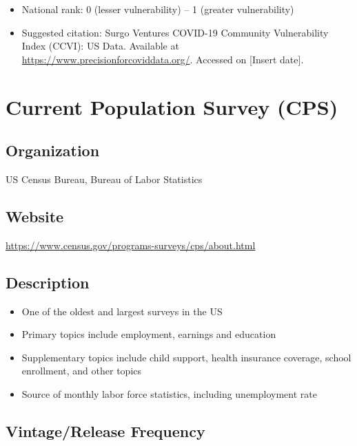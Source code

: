 \documentclass[
]{book}
\providecommand{\tightlist}{%
  \setlength{\itemsep}{0pt}\setlength{\parskip}{0pt}}
\begin{document}
\begin{itemize}
\tightlist
\item
  National rank: 0 (lesser vulnerability) -- 1 (greater vulnerability)
\item
  Suggested citation: Surgo Ventures COVID-19 Community Vulnerability Index (CCVI): US Data. Available at \url{https://www.precisionforcoviddata.org/}. Accessed on {[}Insert date{]}.
\end{itemize}

\mainmatter

\hypertarget{current-population-survey-cps}{%
\chapter{Current Population Survey (CPS)}\label{current-population-survey-cps}}

\hypertarget{organization-22}{%
\section{Organization}\label{organization-22}}

US Census Bureau, Bureau of Labor Statistics

\hypertarget{website-22}{%
\section{Website}\label{website-22}}

\url{https://www.census.gov/programs-surveys/cps/about.html}

\hypertarget{description-22}{%
\section{Description}\label{description-22}}

\begin{itemize}
\tightlist
\item
  One of the oldest and largest surveys in the US
\item
  Primary topics include employment, earnings and education
\item
  Supplementary topics include child support, health insurance coverage, school enrollment, and other topics
\item
  Source of monthly labor force statistics, including unemployment rate
\end{itemize}

\hypertarget{vintagerelease-frequency-22}{%
\section{Vintage/Release Frequency}\label{vintagerelease-frequency-22}}
\end{document}
